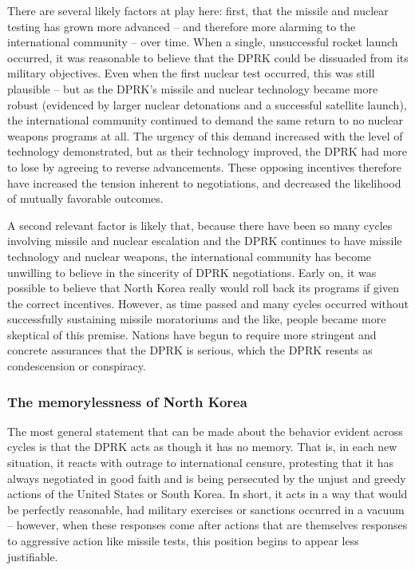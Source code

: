 \documentclass{article}
\begin{document}
There are several likely factors at play here: first, that the missile and nuclear testing has grown more advanced – and therefore more alarming to the international community – over time. When a single, unsuccessful rocket launch occurred, it was reasonable to believe that the DPRK could be dissuaded from its military objectives. Even when the first nuclear test occurred, this was still plausible – but as the DPRK’s missile and nuclear technology became more robust (evidenced by larger nuclear detonations and a successful satellite launch), the international community continued to demand the same return to no nuclear weapons programs at all. The urgency of this demand increased with the level of technology demonstrated, but as their technology improved, the DPRK had more to lose by agreeing to reverse advancements. These opposing incentives therefore have increased the tension inherent to negotiations, and decreased the likelihood of mutually favorable outcomes.

A second relevant factor is likely that, because there have been so many cycles involving missile and nuclear escalation and the DPRK continues to have missile technology and nuclear weapons, the international community has become unwilling to believe in the sincerity of DPRK negotiations. Early on, it was possible to believe that North Korea really would roll back its programs if given the correct incentives. However, as time passed and many cycles occurred without successfully sustaining missile moratoriums and the like, people became more skeptical of this premise. Nations have begun to require more stringent and concrete assurances that the DPRK is serious, which the DPRK resents as condescension or conspiracy.

\subsubsection{The memorylessness of North Korea}
The most general statement that can be made about the behavior evident across cycles is that the DPRK acts as though it has no memory. That is, in each new situation, it reacts with outrage to international censure, protesting that it has always negotiated in good faith and is being persecuted by the unjust and greedy actions of the United States or South Korea. In short, it acts in a way that would be perfectly reasonable, had military exercises or sanctions occurred in a vacuum – however, when these responses come after actions that are themselves responses to aggressive action like missile tests, this position begins to appear less justifiable.
\end{document}
